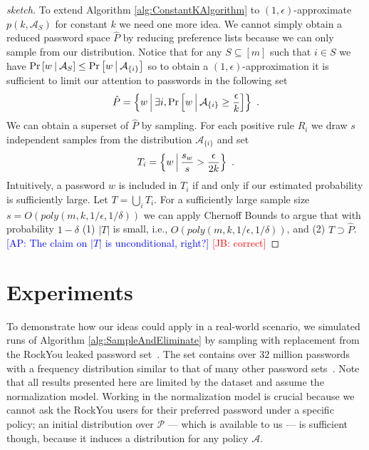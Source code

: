 \documentclass[prodmode,acmec]{ec-acmsmall}
\newcommand{\kibitz}[2]{\ifnum\Comments=1\textcolor{#1}{#2}\fi}
\newcommand{\ap}[1]{\kibitz{blue} {[AP: #1]}}
\newcommand{\jb}[1]{\kibitz{red} {[JB: #1]}}
\newcommand{\PasswordSpace}{\mathcal{P}}
\begin{document}
\begin{proof}[sketch]
To extend Algorithm \ref{alg:ConstantKAlgorithm} to $(1,\epsilon)$-approximate $p\left(k,\mathcal{A}_S\right)$ for constant $k$ we need one more idea. We cannot simply obtain a reduced password space $\hat{P}$ by reducing preference lists because we can only sample from our distribution. Notice that for any $S \subseteq [m]$ such that $i \in S$ we have $\Pr\left[ w ~\vline~ \mathcal{A}_S \right] \leq  \Pr\left[w ~\vline~ \mathcal{A}_{\{i\}}\right]$ so to obtain a $(1,\epsilon)$-approximation it is sufficient to limit our attention to passwords in the following set
\[\hat{P} =  \left\{w~\vline~\exists i, \Pr\left[w~\vline~\mathcal{A}_{\{i\}} \geq \frac{\epsilon}{k} \right] \right\}  \ .\]
We can obtain a superset of $\hat{P}$ by sampling. For each positive rule $R_i$ we draw $s$ independent samples from the distribution $\mathcal{A}_{\{i\}}$ and set
\[T_i = \left\{ w~\vline~\frac{s_w}{s} > \frac{\epsilon}{2k} \right\} \ . \]
Intuitively, a password $w $ is included in $T_i$ if and only if our estimated probability is sufficiently large. Let $T = \bigcup_i T_i$. For a sufficiently large sample size $s=O\left(poly\left(m,k,1/\epsilon,1/\delta \right) \right)$ we can apply Chernoff Bounds to argue that with probability $1-\delta$  (1) $\left|T\right|$ is small, i.e., $O\left(poly\left(m,k,1/\epsilon,1/\delta \right) \right)$, and (2) $T \supset \hat{P}$. \ap{The claim on $|T|$ is unconditional, right?} \jb{correct}
\end{proof}


\section{Experiments} \label{sec:experiments}


To demonstrate how our ideas could apply in a real-world scenario, we simulated runs of Algorithm \ref{alg:SampleAndEliminate} by sampling with replacement from the RockYou leaked password set~\cite{rockYouPasswords}. The set contains over 32 million passwords with a frequency distribution similar to that of many other password sets~\cite{bonneau2012science}. Note that all results presented here are limited by the dataset and assume the normalization model. Working in the normalization model is crucial because we cannot ask the RockYou users for their preferred password under a specific policy; an initial distribution over $\PasswordSpace$ --- which is available to us --- is sufficient though, because it induces a distribution for any policy $\mathcal{A}$. 
\end{document}
